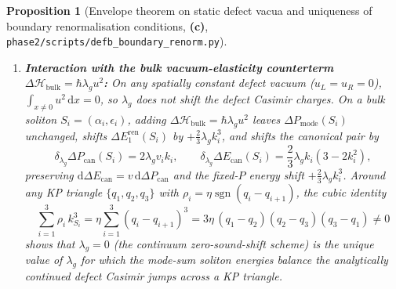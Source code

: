 \documentclass[11pt,a4paper]{article}
\newtheorem{proposition}[theorem]{Proposition}
\theoremstyle{remark}
\newcommand{\hb}{\hbar}
\newcommand{\dd}{\mathrm{d}}
\newcommand{\sgn}{\operatorname{sgn}}
\newcommand{\Lc}{\textbf{(c)}}
\newcommand{\sren}{\texttt{phase2/\allowbreak scripts/\allowbreak defb\_\allowbreak boundary\_\allowbreak renorm.py}}
\begin{document}
\begin{proposition}[Envelope theorem on static defect vacua and uniqueness of boundary renormalisation conditions, \Lc, \sren]
\begin{enumerate}
\begin{itemize}
so the quantum ground-state charges are given purely by the spectral Casimir
integrals $\Delta E_D^{\mathrm{ren}}, \Delta P_D^{\mathrm{Cas}}$) uniquely fixes
$\delta\tau_{0,1} = 0$ and $\delta h_{0,1} = 0$. (Alternative ground-state
normalisation conventions shift all three vacua by the same constant and cancel
in all vacuum jumps $Q_D(q_{i+1}) - Q_D(q_i)$.)
\item[(c)] \emph{Zero-momentum transmission slope (scattering length):}
At $q = 0$, the phonon transmission amplitude \eqref{eq:zph_phonon} is
topologically pinned to $z_{\mathrm{ph}}(0;s,\eta) = +1$ for every non-cusp
vacuum $s \ne -1$, so the value at $q=0$ cannot fix $\delta s_1$. However, the
zero-momentum phase derivative (defect scattering length)
\begin{equation}\label{eq:aD_slope}
  a_D(s,\eta) := \left.\frac{\dd\theta_D^{\mathrm{phys}}(q;s,\eta)}{\dd q}\right|_{q=0^+}
  = -\frac{2\sqrt{3}\,\eta}{s + 1}
\end{equation}
is a strictly monotone one-to-one function of $s$ on the stable half-line
$\eta s \le -1$. Defining the renormalised defect parameter $s_{\mathrm{ren}}$
by $a_D^{\mathrm{ren}}(s_{\mathrm{ren}},\eta) = -\frac{2\sqrt{3}\eta}{s_{\mathrm{ren}}+1}$
(or by the physical soliton absorption root $q_D^{\mathrm{ren}} = -s_{\mathrm{ren}}/(2\sqrt{3})$)
uniquely fixes $\delta s_1 = 0$.
\end{itemize}
\item \textbf{Interaction with the bulk vacuum-elasticity counterterm
$\Delta\mathcal{H}_{\mathrm{bulk}} = \hb\lambda_g u^2$:}
On any spatially constant defect vacuum ($u_L = u_R = 0$),
$\int_{x\ne 0} u^2\,\dd x = 0$, so $\lambda_g$ does not shift the defect
Casimir charges. On a bulk soliton $S_i = (\alpha_i,\epsilon_i)$, adding
$\Delta\mathcal{H}_{\mathrm{bulk}} = \hb\lambda_g u^2$ leaves
$\Delta P_{\mathrm{mode}}(S_i)$ unchanged, shifts $\Delta E_1^{\mathrm{ren}}(S_i)$
by $+\frac{2}{3}\lambda_g k_i^3$, and shifts the canonical pair by
\begin{equation}\label{eq:lam_g_shifts}
  \delta_{\lambda_g}\Delta P_{\mathrm{can}}(S_i) = 2\lambda_g v_i k_i, \qquad
  \delta_{\lambda_g}\Delta E_{\mathrm{can}}(S_i) = \frac{2}{3}\lambda_g k_i(3 - 2k_i^2),
\end{equation}
preserving $\dd\Delta E_{\mathrm{can}} = v\,\dd\Delta P_{\mathrm{can}}$ and the
fixed-$P$ energy shift $+\frac{2}{3}\lambda_g k_i^3$. Around any KP triangle
$\{q_1,q_2,q_3\}$ with $\rho_i = \eta\sgn(q_i - q_{i+1})$, the cubic identity
\begin{equation}\label{eq:cube_sum_id}
  \sum_{i=1}^3 \rho_i\,k_{S_i}^3
  = \eta\sum_{i=1}^3 (q_i - q_{i+1})^3
  = 3\eta\,(q_1 - q_2)(q_2 - q_3)(q_3 - q_1) \ne 0
\end{equation}
shows that $\lambda_g = 0$ (the continuum zero-sound-shift scheme) is the
\emph{unique} value of $\lambda_g$ for which the mode-sum soliton energies
balance the analytically continued defect Casimir jumps across a KP triangle.
\end{enumerate}
\end{proposition}
\end{document}
